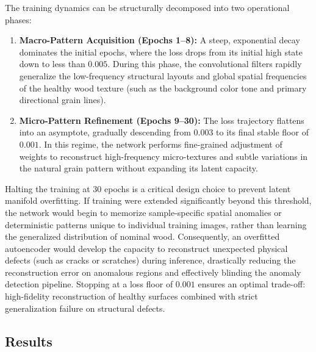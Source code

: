 \documentclass[10pt,twocolumn,a4paper]{article}
\begin{document}
The training dynamics can be structurally decomposed into two operational phases:
\begin{enumerate}
    \item \textbf{Macro-Pattern Acquisition (Epochs 1–8):} A steep, exponential decay dominates the initial epochs, where the loss drops from its initial high state down to less than $0.005$. During this phase, the convolutional filters rapidly generalize the low-frequency structural layouts and global spatial frequencies of the healthy wood texture (such as the background color tone and primary directional grain lines).
    \item \textbf{Micro-Pattern Refinement (Epochs 9–30):} The loss trajectory flattens into an asymptote, gradually descending from $0.003$ to its final stable floor of $0.001$. In this regime, the network performs fine-grained adjustment of weights to reconstruct high-frequency micro-textures and subtle variations in the natural grain pattern without expanding its latent capacity.
\end{enumerate}

Halting the training at $30$ epochs is a critical design choice to prevent latent manifold overfitting. If training were extended significantly beyond this threshold, the network would begin to memorize sample-specific spatial anomalies or deterministic patterns unique to individual training images, rather than learning the generalized distribution of nominal wood. Consequently, an overfitted autoencoder would develop the capacity to reconstruct unexpected physical defects (such as cracks or scratches) during inference, drastically reducing the reconstruction error on anomalous regions and effectively blinding the anomaly detection pipeline. Stopping at a loss floor of $0.001$ ensures an optimal trade-off: high-fidelity reconstruction of healthy surfaces combined with strict generalization failure on structural defects.


	
	\subsection{Results}
\end{document}
